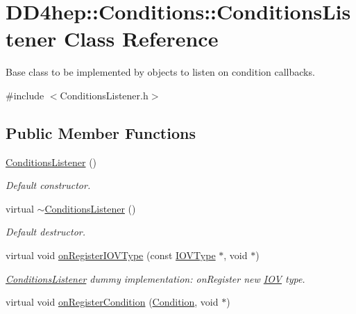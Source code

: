\hypertarget{class_d_d4hep_1_1_conditions_1_1_conditions_listener}{
\section{DD4hep::Conditions::ConditionsListener Class Reference}
\label{class_d_d4hep_1_1_conditions_1_1_conditions_listener}
}


Base class to be implemented by objects to listen on condition callbacks.  


{\ttfamily \#include $<$ConditionsListener.h$>$}\subsection*{Public Member Functions}
\begin{DoxyCompactItemize}
\item 
\hyperlink{class_d_d4hep_1_1_conditions_1_1_conditions_listener_a3045043973d530d2c01ccb26462a8795}{ConditionsListener} ()
\begin{DoxyCompactList}\small\item\em Default constructor. \item\end{DoxyCompactList}\item 
virtual \hyperlink{class_d_d4hep_1_1_conditions_1_1_conditions_listener_a75358af2c660cee415619ba50c2bea74}{$\sim$ConditionsListener} ()
\begin{DoxyCompactList}\small\item\em Default destructor. \item\end{DoxyCompactList}\item 
virtual void \hyperlink{class_d_d4hep_1_1_conditions_1_1_conditions_listener_a8757616579713cf0101d5c6b68460f9d}{onRegisterIOVType} (const \hyperlink{class_d_d4hep_1_1_i_o_v_type}{IOVType} $\ast$, void $\ast$)
\begin{DoxyCompactList}\small\item\em \hyperlink{class_d_d4hep_1_1_conditions_1_1_conditions_listener}{ConditionsListener} dummy implementation: onRegister new \hyperlink{class_d_d4hep_1_1_i_o_v}{IOV} type. \item\end{DoxyCompactList}\item 
virtual void \hyperlink{class_d_d4hep_1_1_conditions_1_1_conditions_listener_a848d047b6a957987ea1a8256e6efd75a}{onRegisterCondition} (\hyperlink{class_d_d4hep_1_1_conditions_1_1_condition}{Condition}, void $\ast$)

\end{DoxyCompactItemize}
